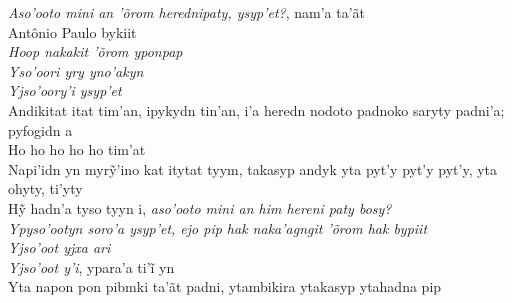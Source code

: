 \begin{linenumbers}\begingroup\raggedright

\noindent   \emph{Aso'ooto mini an 'õrom herednipaty, ysyp'et?}, nam'a ta'ãt\\
 Antônio Paulo bykiit\\
  \emph{Hoop nakakit 'õrom yponpap}\\
  \emph{Yso'oori yry yno'akyn}\\
  \emph{Yjso'oory'i ysyp'et}\\
  Andikitat itat tim'an, ipykydn tin'an, i'a heredn nodoto padnoko
 saryty padni'a; pyfogidn a\\
  Ho ho ho ho ho tim'at\\
  Napi’idn yn myrỹ’ino kat itytat tyym, takasyp andyk yta pyt’y pyt’y pyt’y, yta ohyty, ti’yty\\
  Hỹ hadn’a tyso tyyn i, \emph{aso’ooto mini an him hereni paty bosy?}\\
  \emph{Ypyso'ootyn soro'a ysyp'et, ejo pip hak naka'agngit 'õrom hak bypiit}\\
  \emph{Yjso'oot yjxa ari}\\
  \emph{Yjso’oot y’i}, ypara’a ti’ĩ yn\\
  Yta napon pon pibmki ta'ãt padni, ytambikira ytakasyp ytahadna pip

\end{linenumbers}\endgroup

\bigskip


